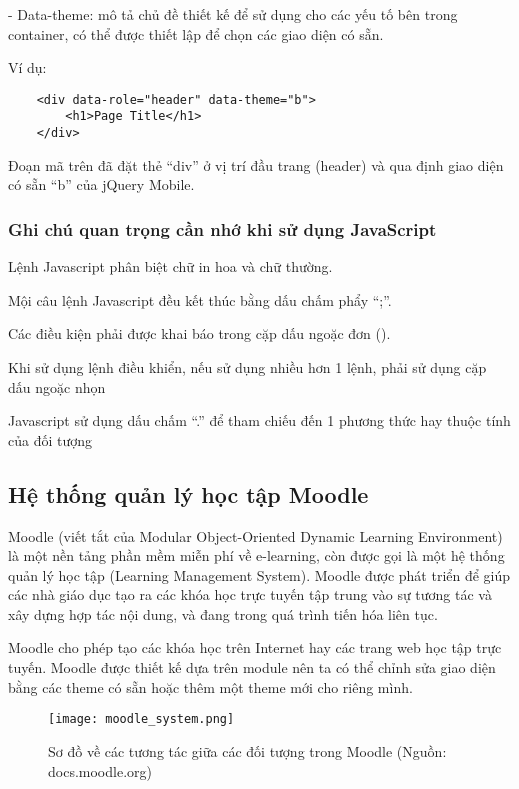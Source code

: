 \quad - Data-theme: mô tả chủ đề thiết kế để sử dụng cho các yếu tố bên trong container, có thể được thiết lập để chọn các giao diện có sẵn.

Ví dụ:

\begin{lstlisting}
	<div data-role="header" data-theme="b"> 
		<h1>Page Title</h1> 
	</div>
\end{lstlisting}

Đoạn mã trên đã đặt thẻ “div” ở vị trí đầu trang (header) và qua định giao diện có sẵn “b” của jQuery Mobile.

\subsubsection{Ghi chú quan trọng cần nhớ khi sử dụng JavaScript}

Lệnh Javascript phân biệt chữ in hoa và chữ thường.

Mội câu lệnh Javascript đều kết thúc bằng dấu chấm phẩy “;”.

Các điều kiện phải được khai báo trong cặp dấu ngoặc đơn ().

Khi sử dụng lệnh điều khiển, nếu sử dụng nhiều hơn 1 lệnh, phải sử dụng cặp dấu ngoặc nhọn {}

Javascript sử dụng dấu chấm “.” để tham chiếu đến 1 phương thức hay thuộc tính của đối tượng 

\subsection{Hệ thống quản lý học tập Moodle}

Moodle (viết tắt của Modular Object-Oriented Dynamic Learning Environment) là một nền tảng phần mềm miễn phí về e-learning, còn được gọi là một hệ thống quản lý học tập (Learning Management System). Moodle được phát triển để giúp các nhà giáo dục tạo ra các khóa học trực tuyến tập trung vào sự tương tác và xây dựng hợp tác nội dung, và đang trong quá trình tiến hóa liên tục.

Moodle cho phép tạo các khóa học trên Internet hay các trang web học tập trực tuyến. Moodle được thiết kế dựa trên module nên ta có thể chỉnh sửa giao diện bằng các theme có sẵn hoặc thêm một theme mới cho riêng mình.

\begin{figure}[!htb] 
\centering
\texttt{[image: moodle\_system.png]}
\caption{Sơ đồ về các tương tác giữa các đối tượng trong Moodle (Nguồn: docs.moodle.org)}
\end{figure}

